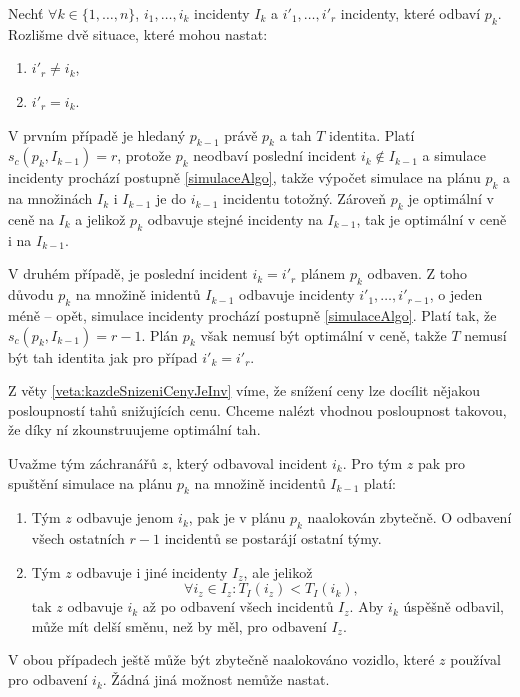 \begin{dukaz}
  Nechť $\forall k \in \{ 1, \dots, n\}$, $i_1, \dots, i_k$ incidenty $I_k$ a $i'_1, \dots, i'_r$ incidenty, které odbaví $p_k$.
  Rozlišme dvě situace, které mohou nastat:
  \begin{enumerate}
    \item
      $i'_r \neq i_k$,

    \item
      $i'_r = i_k$.
  \end{enumerate}
  V prvním případě je hledaný $p_{k-1}$ právě $p_k$ a tah $T$ identita.
  Platí $s_c(p_k, I_{k-1}) = r$, protože $p_k$ neodbaví poslední incident $i_k \not \in I_{k-1}$ a simulace incidenty prochází postupně \ref{simulaceAlgo},
  takže výpočet simulace na plánu $p_{k}$ a na množinách $I_k$ i $I_{k-1}$ je do $i_{k-1}$ incidentu totožný.
  Zároveň $p_k$ je optimální v ceně na $I_k$ a jelikož $p_k$ odbavuje stejné incidenty na $I_{k-1}$, tak je optimální v ceně i na $I_{k-1}$.

  V druhém případě, je poslední incident $i_k = i'_r$ plánem $p_k$ odbaven.
  Z toho důvodu $p_k$ na množině inidentů $I_{k-1}$ odbavuje incidenty $i'_1, \dots, i'_{r-1}$, o jeden méně -- opět, simulace incidenty prochází postupně \ref{simulaceAlgo}.
  Platí tak, že $s_c(p_k, I_{k-1}) = r - 1$. Plán $p_k$ však nemusí být optimální v ceně, takže $T$ nemusí být tah identita jak pro případ $i'_k = i'_r$. 

  Z věty \ref{veta:kazdeSnizeniCenyJeInv} víme, že snížení ceny lze docílit nějakou posloupností tahů snižujících cenu.
  Chceme nalézt vhodnou posloupnost takovou, že díky ní zkounstruujeme optimální tah.

  Uvažme tým záchranářů $z$, který odbavoval incident $i_k$.
  Pro tým $z$ pak pro spuštění simulace na plánu $p_k$ na množině incidentů $I_{k-1}$ platí:
  \begin{enumerate}
    \item
      Tým $z$ odbavuje jenom $i_k$, pak je v plánu $p_k$ naalokován zbytečně. O odbavení všech ostatních $r-1$ incidentů se postarájí ostatní týmy.

    \item
      Tým $z$ odbavuje i jiné incidenty $I_z$, ale jelikož
      \begin{equation*}
        \forall i_z \in I_z \colon T_I(i_z) < T_I(i_k),
      \end{equation*}
      tak $z$ odbavuje $i_k$ až po odbavení všech incidentů $I_z$.
      Aby $i_k$ úspěšně odbavil, může mít delší směnu, než by měl, pro odbavení $I_z$.
  \end{enumerate}
  V obou případech ještě může být zbytečně naalokováno vozidlo, které $z$ používal pro odbavení $i_k$.
  Žádná jiná možnost nemůže nastat.


\end{dukaz}
